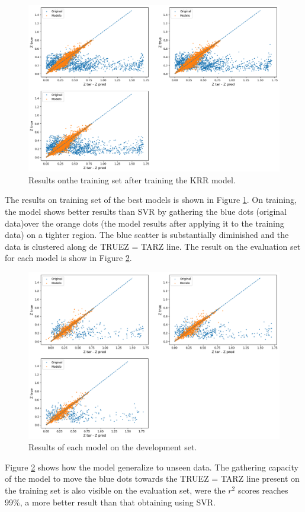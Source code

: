 \begin{figure}[th!]
	\centering
	\includegraphics[width=1.0\linewidth]{TeX_files/Imagenes/krr-train}
	\caption{Results onthe training set after training the KRR model.}
	\label{fig:krr-train}
\end{figure}
The results on training set of the best models is shown in Figure \ref{fig:krr-train}. On training, the model shows better results than SVR by gathering the blue dots (original data)over the orange dots (the model results after applying it to the training data) on a tighter region. The blue scatter is substantially diminished and the data is clustered along de TRUEZ = TARZ line. The result on the evaluation set for each model is show in Figure \ref{fig:krr-test}. 
\begin{figure}[th!]
	\centering
	\includegraphics[width=1.0\linewidth]{TeX_files/Imagenes/krr-test}
	\caption{Results of each model on the development set.}
	\label{fig:krr-test}
\end{figure}
Figure \ref{fig:krr-test} shows how the model generalize to unseen data. The gathering capacity of the model to move the blue dots towards the TRUEZ = TARZ line present on the training set is also visible on the evaluation set, were the $r^2$ scores reaches 99\%, a more better result than that obtaining using SVR. 

